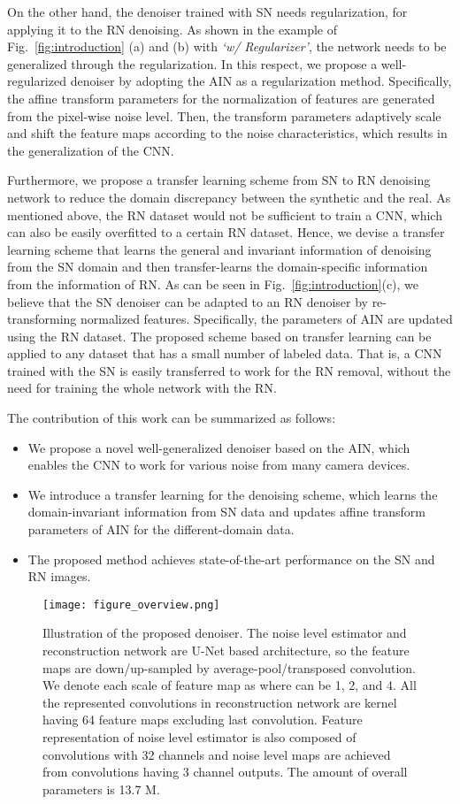 \documentclass[10pt,twocolumn,letterpaper]{article}
\begin{document}
On the other hand, the denoiser trained with SN needs regularization, for applying it to the RN denoising. As shown in the example of Fig.~\ref{fig:introduction} (a) and (b) with \textit{`w/ Regularizer'}, the network needs to be generalized through the regularization.
In this respect, we propose a well-regularized denoiser by adopting the AIN as a regularization method.
Specifically, the affine transform parameters for the normalization of features are generated from the pixel-wise noise level. Then, the transform parameters adaptively scale and shift the feature maps according to the noise characteristics, which results in the generalization of the CNN.

Furthermore, we propose a transfer learning scheme from SN to RN denoising network to reduce the domain discrepancy between the synthetic and the real.
As mentioned above, the RN dataset would not be sufficient to train a CNN, which can also be easily overfitted to a certain RN dataset.
Hence, we devise a transfer learning scheme that learns the general and invariant information of denoising from the SN domain and then transfer-learns the domain-specific information from the information of RN.
As can be seen in Fig.~\ref{fig:introduction}(c), we believe that the SN denoiser can be adapted to an RN denoiser by re-transforming normalized features.
Specifically, the parameters of AIN are updated using the RN dataset. The proposed scheme based on transfer learning can be applied to any dataset that has a small number of labeled data. That is, a CNN trained with the SN is easily transferred to work for the RN removal, without the need for training the whole network with the RN.

The contribution of this work can be summarized as follows:
\begin{itemize}
	\item We propose a novel well-generalized denoiser based on the AIN, which enables the CNN to work for various noise from many camera devices.	
	\item We introduce a transfer learning for the denoising scheme, which learns the domain-invariant information from SN data and updates affine transform parameters of AIN for the different-domain data.
	\item The proposed method achieves state-of-the-art performance on the SN and RN images.	
\end{itemize}
\begin{figure*}[t]
	\centering				
	\texttt{[image: figure\_overview.png]} 
	\caption{
		Illustration of the proposed denoiser. 
		The noise level estimator and reconstruction network are U-Net based architecture, so the feature maps are down/up-sampled by average-pool/transposed convolution. We denote each scale of feature map as  where  can be 1, 2, and 4. All the represented convolutions in reconstruction network are  kernel having 64 feature maps excluding last convolution.  Feature representation of noise level estimator is also composed of  convolutions with 32 channels and noise level maps are achieved from  convolutions having 3 channel outputs. 
		The amount of overall parameters is 13.7 M.
	}			
	\label{fig:overview}	
\end{figure*}
\end{document}
